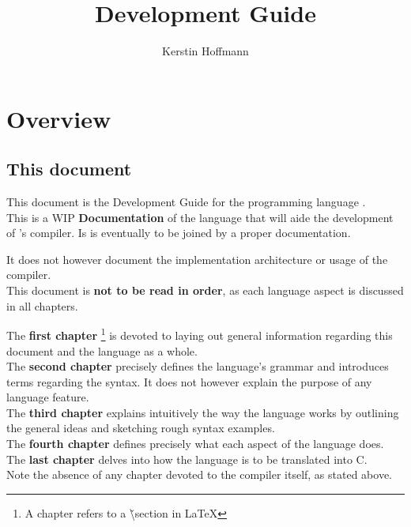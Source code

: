 \documentclass{article}
\title{\lazydog  Development Guide}
\author{Kerstin Hoffmann}
\date{}
\begin{document}

\focus
\maketitle
\tableofcontents

\section{Overview}
\subsection{This document}
This document is the Development Guide
for the programming language \lazydog.\\

This is a WIP {\bf Documentation} of the language
that will aide the development of \lazydog's compiler.
Is is eventually to be joined by a proper
documentation.

It does not however document the implementation
architecture or usage of the \lazydog
compiler.\\

This document is {\bf not to be read in order},
as each language aspect is discussed in all chapters.

The {\bf first chapter}
\footnote{A chapter refers to a \v{\textbackslash section} in \LaTeX}
is devoted to laying
out general information regarding this document
and the language as a whole.\\

The {\bf second chapter} precisely defines
the language's grammar and introduces terms
regarding the syntax. 
It does not however explain the purpose of any language
feature.\\

The {\bf third chapter} explains intuitively the way the language
works by outlining the general ideas and sketching rough
syntax examples.\\

The {\bf fourth chapter} defines precisely what each
aspect of the language does.\\

The {\bf last chapter} delves into how the language is
to be translated into C.\\

Note the absence of any chapter devoted to the compiler itself,
as stated above.
\end{document}
